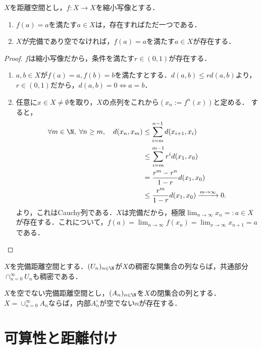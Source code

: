 \documentclass[uplatex,dvipdfmx]{jsreport}
\begin{document}
\begin{proposition}[完備距離空間の縮小写像には不動点が存在する]
    $X$を距離空間とし，$f:X\to X$を縮小写像とする．
    \begin{enumerate}
        \item $f(a)=a$を満たす$a\in X$は，存在すればただ一つである．
        \item $X$が完備であり空でなければ，$f(a)=a$を満たす$a\in X$が存在する．
    \end{enumerate}
\end{proposition}
\begin{proof}
    $f$は縮小写像だから，条件を満たす$r\in(0,1)$が存在する．
    \begin{enumerate}
        \item $a,b\in X$が$f(a)=a,f(b)=b$を満たすとする．$d(a,b)\le rd(a,b)$より，$r\in(0,1)$だから，$d(a,b)=0\Leftrightarrow a=b$．
        \item 任意に$x\in X\ne\emptyset$を取り，$X$の点列をこれから$(x_n:=f^n(x))$と定める．
        すると，
        \begin{align*}
            \forall m\in\N,\;\forall n\ge m,\quad d(x_n,x_m)&\le \sum^{n-1}_{i=m}d(x_{i+1},x_i)\\
            &\le \sum^{m-1}_{i=m}r^id(x_1,x_0)\\
            &=\frac{r^m-r^n}{1-r}d(x_1,x_0)\\
            &\le \frac{r^m}{1-r}d(x_1,x_0)\xrightarrow{m\to\infty}0.
        \end{align*}
        より，これはCauchy列である．$X$は完備だから，極限$\lim_{n\to\infty}x_n=:a\in X$が存在する．これについて，$f(a)=\lim_{n\to\infty}f(x_n)=\lim_{x\to\infty}x_{n+1}=a$である．
    \end{enumerate}
\end{proof}

\begin{proposition}[AC, 完備距離異空間の稠密開集合の可算共通部分は稠密]
    $X$を完備距離空間とする．$(U_n)_{n\in\N}$が$X$の稠密な開集合の列ならば，共通部分$\cap_{n=0}^\infty U_n$も稠密である．
\end{proposition}

\begin{corollary}[Baire, AC]
    $X$を空でない完備距離空間とし，$(A_n)_{n\in\N}$を$X$の閉集合の列とする．$X=\cup_{n=0}^\infty A_n$ならば，内部$A^\circ_n$が空でない$n$が存在する．
\end{corollary}

\section{可算性と距離付け}
\end{document}
